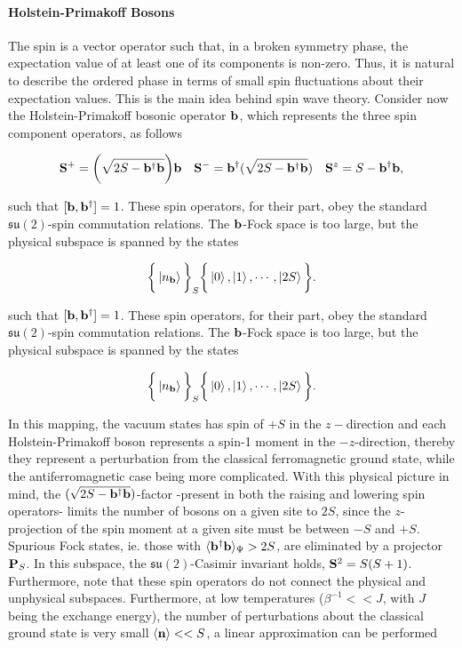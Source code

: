 \documentclass{homework}
\begin{document}
\paragraph{Holstein-Primakoff Bosons}

The spin is a vector operator such that, in a broken symmetry phase, the expectation value of at least one of its components is non-zero. Thus, it is natural to describe the ordered phase in terms of small spin fluctuations about their expectation values. This is the main idea behind spin wave theory. Consider now the Holstein-Primakoff bosonic operator ${\bf b}$, which represents the three spin component operators, as follows 

\begin{align}
    {\bf S}^+ &= \bigg(\sqrt{2 S - {\bf b}^\dagger {\bf b}}\bigg) {\bf b} & {\bf S}^- &= {\bf b}^\dagger (\sqrt{2 S - {\bf b}^\dagger {\bf b}}) & {\bf S}^z = S - {\bf b}^\dagger {\bf b}, 
    \label{Holstein_Primakoff}
\end{align}

such that $[{\bf b}, {\bf b}^\dagger] = 1$. These spin operators, for their part, obey the standard $\mathfrak{s}\mathfrak{u}(2)$-spin commutation relations. The ${\bf b}$-Fock space is too large, but the physical subspace is spanned by the states 

$$
    \bigg\{\ket{n_{\bf b}}\bigg\}_S \bigg\{ \ket{0}, \ket{1}, \cdots, \ket{2S}\bigg\}.
$$

such that $[{\bf b}, {\bf b}^\dagger] = 1$. These spin operators, for their part, obey the standard $\mathfrak{s}\mathfrak{u}(2)$-spin commutation relations. The ${\bf b}$-Fock space is too large, but the physical subspace is spanned by the states 

$$
    \bigg\{\ket{n_{\bf b}}\bigg\}_S \bigg\{ \ket{0}, \ket{1}, \cdots, \ket{2S}\bigg\}.
$$

In this mapping, the vacuum states has spin of $+S$ in the $z-$direction and each Holstein-Primakoff boson represents a spin-1 moment in the $-z$-direction, thereby they represent a perturbation from the classical ferromagnetic ground state, while the antiferromagnetic case being more complicated. With this physical picture in mind, the $(\sqrt{2S-{\bf b}^\dagger {\bf b}})$-factor -present in both the raising and lowering spin operators- limits the number of bosons on a given site to $2S$, since the $z$-projection of the spin moment at a given site must be between $-S$ and $+S$. \\

Spurious Fock states, ie. those with $\langle{{\bf b}^\dagger {\bf b}}\rangle_{\Psi} > 2S$, are eliminated by a projector ${\bf P}_S$. In this subspace, the $\mathfrak{s}\mathfrak{u}(2)$-Casimir invariant holds, ${\bf S}^2 = S(S+1)$. Furthermore, note that these spin operators do not connect the physical and unphysical subspaces. Furthermore, at low temperatures ($\beta^{-1} << J$, with $J$ being the exchange energy), the number of perturbations about the classical ground state is very small $\langle {\bf n} \rangle << S$, a linear approximation can be performed
\end{document}
